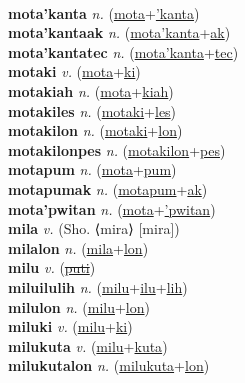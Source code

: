  \label{motaswalum} \\
\textbf{mota'kanta} \textit{n.} (\hyperref[mota]{mota}+\hyperref['kanta]{'kanta})
 \label{mota'kanta} \\
\textbf{mota'kantaak} \textit{n.} (\hyperref[mota'kanta]{mota'kanta}+\hyperref[ak]{ak})
 \label{mota'kantaak} \\
\textbf{mota'kantatec} \textit{n.} (\hyperref[mota'kanta]{mota'kanta}+\hyperref[tec]{tec})
 \label{mota'kantatec} \\
\textbf{motaki} \textit{v.} (\hyperref[mota]{mota}+\hyperref[ki]{ki})
 \label{motaki} \\
\textbf{motakiah} \textit{n.} (\hyperref[mota]{mota}+\hyperref[kiah]{kiah})
 \label{motakiah} \\
\textbf{motakiles} \textit{n.} (\hyperref[motaki]{motaki}+\hyperref[les]{les})
 \label{motakiles} \\
\textbf{motakilon} \textit{n.} (\hyperref[motaki]{motaki}+\hyperref[lon]{lon})
 \label{motakilon} \\
\textbf{motakilonpes} \textit{n.} (\hyperref[motakilon]{motakilon}+\hyperref[pes]{pes})
 \label{motakilonpes} \\
\textbf{motapum} \textit{n.} (\hyperref[mota]{mota}+\hyperref[pum]{pum})
 \label{motapum} \\
\textbf{motapumak} \textit{n.} (\hyperref[motapum]{motapum}+\hyperref[ak]{ak})
 \label{motapumak} \\
\textbf{mota'pwitan} \textit{n.} (\hyperref[mota]{mota}+\hyperref['pwitan]{'pwitan})
 \label{mota'pwitan} \\
\textbf{mila} \textit{v.} (Sho. ⟨mira⟩ [mira])
 \label{mila} \\
\textbf{milalon} \textit{n.} (\hyperref[mila]{mila}+\hyperref[lon]{lon})
 \label{milalon} \\
\textbf{milu} \textit{v.} (\hyperref[puti]{\sout{puti}})
 \label{milu} \\
\textbf{miluilulih} \textit{n.} (\hyperref[milu]{milu}+\hyperref[ilu]{ilu}+\hyperref[lih]{lih})
 \label{miluilulih} \\
\textbf{milulon} \textit{n.} (\hyperref[milu]{milu}+\hyperref[lon]{lon})
 \label{milulon} \\
\textbf{miluki} \textit{v.} (\hyperref[milu]{milu}+\hyperref[ki]{ki})
 \label{miluki} \\
\textbf{milukuta} \textit{v.} (\hyperref[milu]{milu}+\hyperref[kuta]{kuta})
 \label{milukuta} \\
\textbf{milukutalon} \textit{n.} (\hyperref[milukuta]{milukuta}+\hyperref[lon]{lon})
